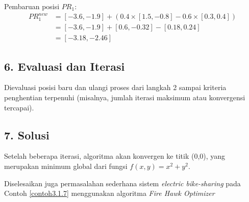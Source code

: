 \begin{contoh}
Pembaruan posisi $PR_1$:
\begin{align*}
    PR_1^{new} &= [-3.6, -1.9] + (0.4 \times [1.5, -0.8] - 0.6 \times [0.3, 0.4]) \\
    &= [-3.6, -1.9] + [0.6, -0.32] - [0.18, 0.24] \\
    &= [-3.18, -2.46]
\end{align*}

\subsection*{6. Evaluasi dan Iterasi}
Dievaluasi posisi baru dan ulangi proses dari langkah 2 sampai kriteria penghentian terpenuhi (misalnya, jumlah iterasi maksimum atau konvergensi tercapai).

\subsection*{7. Solusi}
Setelah beberapa iterasi, algoritma akan konvergen ke titik (0,0), yang merupakan minimum global dari fungsi $f(x,y) = x^2 + y^2.$
\label{contoh3.2.1}
\end{contoh}

Diselesaikan juga permasalahan sederhana sistem \textit{electric bike-sharing} pada Contoh \ref{contoh3.1.7} menggunakan algoritma \textit{Fire Hawk Optimizer} 

